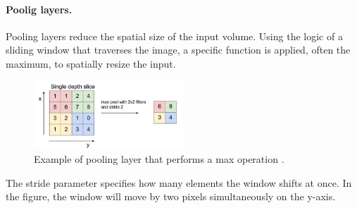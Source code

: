 \paragraph{Poolig layers.} Pooling layers reduce the spatial size of the input volume. Using the logic of a sliding window that traverses the image, a specific function is applied, often the maximum, to spatially resize the input.
\begin{figure}
    \centering
    \includegraphics[width=0.5\textwidth]{Images/pooling.png}
    \caption[Pooling layer.]{Example of pooling layer that performs a max operation \cite{giacomo_boracchi_convolutional_2021}.}
    \label{fig:poolingmax}
\end{figure}
The stride parameter specifies how many elements the window shifts at once. In the figure, the window will move by two pixels simultaneously on the y-axis.

